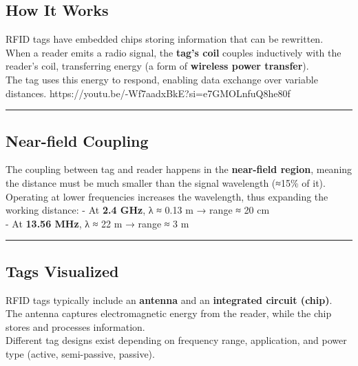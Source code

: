 \documentclass[a4paper, 12pt]{book} %
\begin{document}
\subsection{How It Works}\label{how-it-works}

RFID tags have embedded chips storing information that can be
rewritten.\\
When a reader emits a radio signal, the \textbf{tag's coil} couples
inductively with the reader's coil, transferring energy (a form of
\textbf{wireless power transfer}).\\
The tag uses this energy to respond, enabling data exchange over
variable distances.
https://youtu.be/-Wf7aadxBkE?si=e7GMOLnfuQ8he80f

\begin{center}\rule{0.5\linewidth}{0.5pt}\end{center}

\subsection{Near-field Coupling}\label{near-field-coupling}

The coupling between tag and reader happens in the \textbf{near-field
region}, meaning the distance must be much smaller than the signal
wavelength (≈15\% of it).\\
Operating at lower frequencies increases the wavelength, thus expanding
the working distance: - At \textbf{2.4 GHz}, λ ≈ 0.13 m → range ≈ 20
cm\\
- At \textbf{13.56 MHz}, λ ≈ 22 m → range ≈ 3 m

\begin{center}\rule{0.5\linewidth}{0.5pt}\end{center}

\subsection{Tags Visualized}\label{tags-visualized}

RFID tags typically include an \textbf{antenna} and an
\textbf{integrated circuit (chip)}.\\
The antenna captures electromagnetic energy from the reader, while the
chip stores and processes information.\\
Different tag designs exist depending on frequency range, application,
and power type (active, semi-passive, passive).
\end{document}

